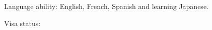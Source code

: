 
\begin{rlist}
  \item Language ability: English, French, Spanish and learning Japanese.
  \item Visa status: \visa 
\end{rlist}

